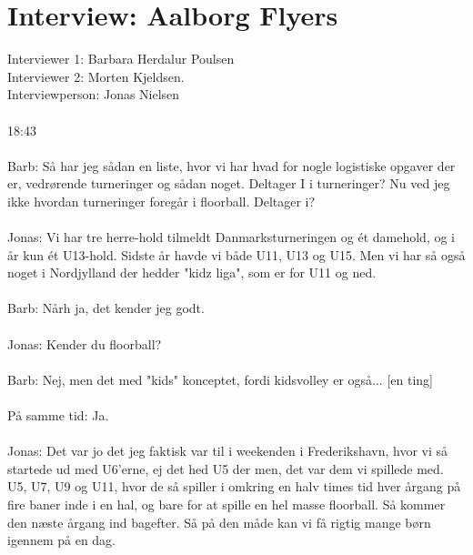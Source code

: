\chapter{Interview: Aalborg Flyers}\label{ch:appClabel}
Interviewer 1: Barbara Herdalur Poulsen\\
Interviewer 2: Morten Kjeldsen.\\
Interviewperson: Jonas Nielsen
\\\\
18:43
\\\\
Barb: Så har jeg sådan en liste, hvor vi har hvad for nogle logistiske opgaver der er, vedrørende turneringer og sådan noget. Deltager I i turneringer? Nu ved jeg ikke hvordan turneringer foregår i floorball. Deltager i?
\\\\
Jonas: Vi har tre herre-hold tilmeldt Danmarksturneringen og ét damehold, og i år kun ét U13-hold. Sidste år havde vi både U11, U13 og U15. Men vi har så også noget i Nordjylland der hedder "kidz liga", som er for U11 og ned.
\\\\
Barb: Nårh ja, det kender jeg godt.
\\\\
Jonas: Kender du floorball?
\\\\
Barb: Nej, men det med "kids" konceptet, fordi kidsvolley er også... [en ting]
\\\\
På samme tid: Ja.
\\\\
Jonas: Det var jo det jeg faktisk var til i weekenden i Frederikshavn, hvor vi så startede ud med U6'erne, ej det hed U5 der men, det var dem vi spillede med. U5, U7, U9 og U11, hvor de så spiller i omkring en halv times tid hver årgang på fire baner inde i en hal, og bare for at spille en hel masse floorball. Så kommer den næste årgang ind bagefter. Så på den måde kan vi få rigtig mange børn igennem på en dag. 
\\\\
